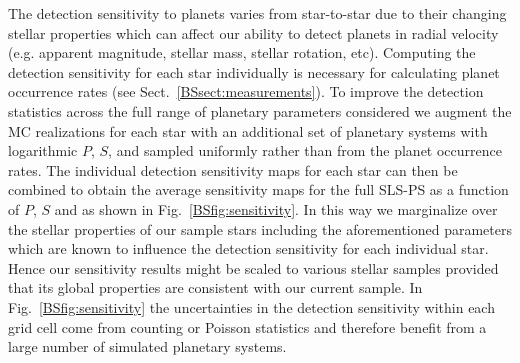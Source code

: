 The detection sensitivity to planets varies from star-to-star due to their changing stellar
properties which can affect our ability to detect planets in radial velocity (e.g. apparent magnitude,
stellar mass, stellar rotation, etc).
Computing the detection sensitivity for each star individually is necessary for calculating planet
occurrence rates (see Sect.~\ref{BSsect:measurements}). To improve the detection statistics across the
full range of planetary parameters considered we augment the MC realizations for each star with an additional
set of planetary systems with logarithmic $P$, $S$, and \msini{} sampled uniformly rather than from the
planet occurrence rates. The individual detection sensitivity maps for each star can then be combined
to obtain the average sensitivity maps for the full
SLS-PS as a function of $P$, $S$ and \msini{} as shown in Fig.~\ref{BSfig:sensitivity}.
In this way we marginalize over the stellar properties of our sample stars including
the aforementioned parameters which are known to influence the detection sensitivity for each individual
star. Hence our sensitivity results might be scaled to various stellar samples provided that its global
properties are consistent with our current sample. In Fig.~\ref{BSfig:sensitivity}
the uncertainties in the detection sensitivity within each grid cell come from counting or Poisson
statistics and therefore benefit from a large number of simulated planetary systems.

